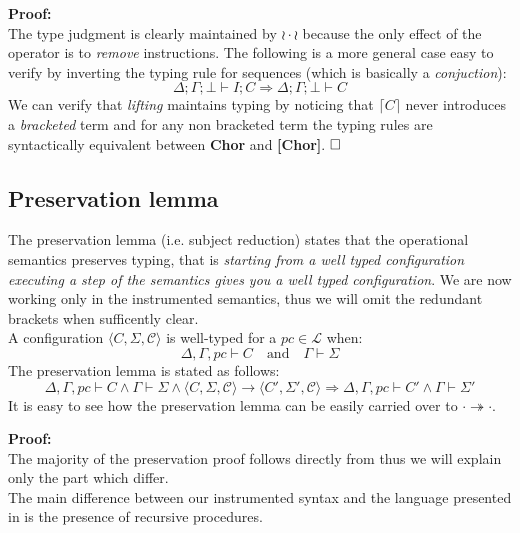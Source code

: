 \documentclass[12pt,a4paper,twoside]{book}
\newcommand{\MCL}{\mathscr{L}}
\newcommand{\qed}{\hfill\square}
\begin{document}
\noindent\textbf{Proof:}\\
The type judgment is clearly maintained by $\wr \cdot \wr$ because the only effect of the operator is to \emph{remove} instructions.
The following is a more general case easy to verify by inverting the typing rule for sequences (which is basically a \emph{conjuction}):
$$
\Delta;\Gamma;\bot \vdash I;C \Rightarrow \Delta;\Gamma;\bot \vdash C
$$
We can verify that \emph{lifting} maintains typing by noticing that $\lceil C \rceil$ never introduces a \emph{bracketed} term and for any non bracketed term the typing rules are syntactically equivalent between \textbf{Chor} and \textbf{[Chor]}.
$\qed$

\subsection{Preservation lemma}
The preservation lemma (i.e. subject reduction) states that the operational semantics preserves typing, that is \emph{starting from a well typed configuration executing a step of the semantics gives you a well typed configuration}.
We are now working only in the instrumented semantics, thus we will omit the redundant brackets when sufficently clear.\\
A configuration
$\langle C, \Sigma, \mathscr{C}\rangle$ is well-typed for a $pc \in \MCL$ when:
$$\Delta, \Gamma, pc \vdash C \quad \text{and}\quad \Gamma \vdash \Sigma$$
The preservation lemma is stated as follows:
\begin{equation}\label{aux:pres}
\Delta, \Gamma, pc \vdash C \land \Gamma \vdash \Sigma \land 
\langle C, \Sigma, \mathscr{C}\rangle \rightarrow
\langle C', \Sigma', \mathscr{C}\rangle \Rightarrow 
\Delta, \Gamma, pc \vdash C' \land \Gamma \vdash \Sigma'
\end{equation}
It is easy to see how the preservation lemma can be easily carried over to $\cdot \twoheadrightarrow \cdot$.

\medskip
\noindent\textbf{Proof:}\\
The majority of the preservation proof follows directly from \cite{myers2011proving} thus we will explain only the part which differ.\\
The main difference between our instrumented syntax and the language presented in \cite{myers2011proving} is the presence of recursive procedures.
\end{document}
